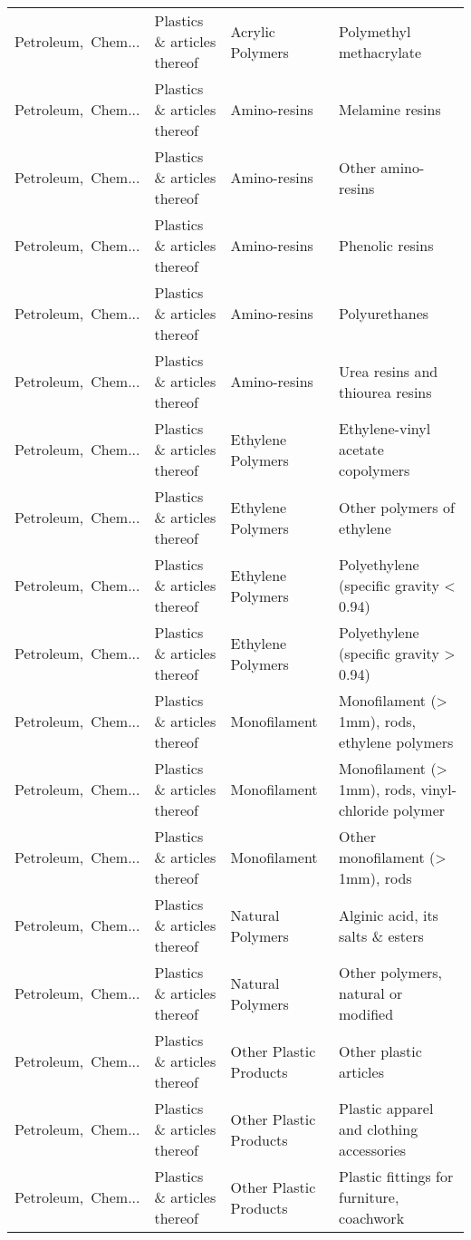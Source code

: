 \begin{appendices}
\begin{xltabular}{\textwidth}{|p{0.10\textwidth}|p{0.25\textwidth}|p{0.24\textwidth}|p{0.31\textwidth}|}
Petroleum,\ Chem... & Plastics \& articles thereof & Acrylic Polymers & Polymethyl methacrylate \\
Petroleum,\ Chem... & Plastics \& articles thereof & Amino-resins & Melamine resins \\
Petroleum,\ Chem... & Plastics \& articles thereof & Amino-resins & Other amino-resins \\
Petroleum,\ Chem... & Plastics \& articles thereof & Amino-resins & Phenolic resins \\
Petroleum,\ Chem... & Plastics \& articles thereof & Amino-resins & Polyurethanes \\
Petroleum,\ Chem... & Plastics \& articles thereof & Amino-resins & Urea resins and thiourea resins \\
Petroleum,\ Chem... & Plastics \& articles thereof & Ethylene Polymers & Ethylene-vinyl acetate copolymers \\
Petroleum,\ Chem... & Plastics \& articles thereof & Ethylene Polymers & Other polymers of ethylene \\
Petroleum,\ Chem... & Plastics \& articles thereof & Ethylene Polymers & Polyethylene (specific gravity < 0.94) \\
Petroleum,\ Chem... & Plastics \& articles thereof & Ethylene Polymers & Polyethylene (specific gravity > 0.94) \\
Petroleum,\ Chem... & Plastics \& articles thereof & Monofilament & Monofilament (> 1mm), rods, ethylene polymers \\
Petroleum,\ Chem... & Plastics \& articles thereof & Monofilament & Monofilament (> 1mm), rods, vinyl-chloride polymer \\
Petroleum,\ Chem... & Plastics \& articles thereof & Monofilament & Other monofilament (> 1mm), rods \\
Petroleum,\ Chem... & Plastics \& articles thereof & Natural Polymers & Alginic acid, its salts \& esters \\
Petroleum,\ Chem... & Plastics \& articles thereof & Natural Polymers & Other polymers, natural or modified \\
Petroleum,\ Chem... & Plastics \& articles thereof & Other Plastic Products & Other plastic articles \\
Petroleum,\ Chem... & Plastics \& articles thereof & Other Plastic Products & Plastic apparel and clothing accessories \\
Petroleum,\ Chem... & Plastics \& articles thereof & Other Plastic Products & Plastic fittings for furniture, coachwork \\

\end{xltabular}
\end{appendices}
